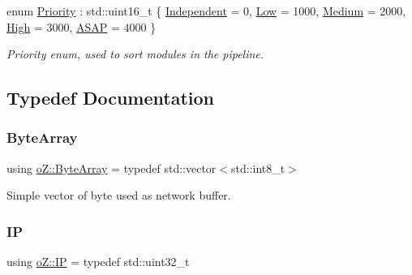 \begin{DoxyCompactItemize}
enum \mbox{\hyperlink{namespaceo_z_af05a92eb185d18369e9b4acdcd9dcd12}{Priority}} \+: std\+::uint16\+\_\+t \{ \newline
\mbox{\hyperlink{namespaceo_z_af05a92eb185d18369e9b4acdcd9dcd12a0bf10abb7e9da477f36b2e69fdae8745}{Independent}} = 0, 
\mbox{\hyperlink{namespaceo_z_af05a92eb185d18369e9b4acdcd9dcd12a44acd2d788f9e79eba46abcb3c006b0e}{Low}} = 1000, 
\mbox{\hyperlink{namespaceo_z_af05a92eb185d18369e9b4acdcd9dcd12a4e322bd010e5b70a4c4172c619a7e370}{Medium}} = 2000, 
\mbox{\hyperlink{namespaceo_z_af05a92eb185d18369e9b4acdcd9dcd12a7f08ba8e8aed8277432e0eba6cf9ffc2}{High}} = 3000, 
\newline
\mbox{\hyperlink{namespaceo_z_af05a92eb185d18369e9b4acdcd9dcd12a3e5081e5e70560fee15eb20b87662a69}{A\+S\+AP}} = 4000
 \}
\begin{DoxyCompactList}\small\item\em Priority enum, used to sort modules in the pipeline. \end{DoxyCompactList}\end{DoxyCompactItemize}


\subsection{Typedef Documentation}
\mbox{\label{namespaceo_z_abfa3f5a46e5c7584615dc1dd33fcafb6}} 
\subsubsection{\texorpdfstring{ByteArray}{ByteArray}}
{\footnotesize\ttfamily using \mbox{\hyperlink{namespaceo_z_abfa3f5a46e5c7584615dc1dd33fcafb6}{o\+Z\+::\+Byte\+Array}} = typedef std\+::vector$<$std\+::int8\+\_\+t$>$}



Simple vector of byte used as network buffer. 

\mbox{\label{namespaceo_z_ace55c2d0182a14ceea9649d0d0cf9c4a}} 
\subsubsection{\texorpdfstring{IP}{IP}}
{\footnotesize\ttfamily using \mbox{\hyperlink{namespaceo_z_ace55c2d0182a14ceea9649d0d0cf9c4a}{o\+Z\+::\+IP}} = typedef std\+::uint32\+\_\+t}

